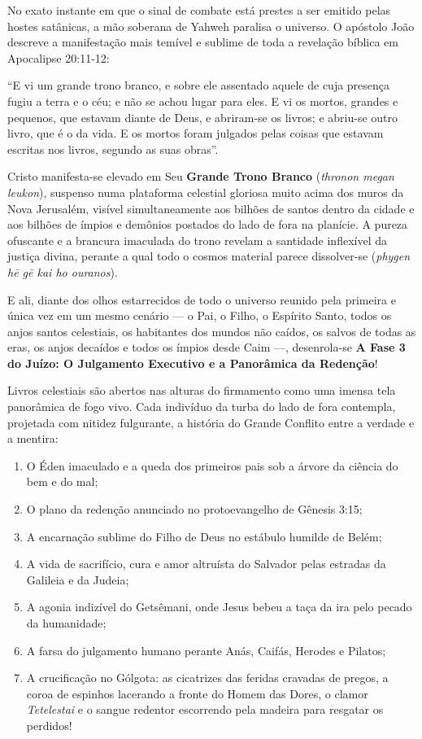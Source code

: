 \documentclass[11pt,a4paper,openany]{book}
\begin{document}
No exato instante em que o sinal de combate está prestes a ser emitido pelas hostes satânicas, a mão soberana de Yahweh paralisa o universo.
O apóstolo João descreve a manifestação mais temível e sublime de toda a revelação bíblica em Apocalipse 20:11-12:

``E vi um grande trono branco, e sobre ele assentado aquele de cuja presença fugiu a terra e o céu; e não se achou lugar para eles. E vi os mortos, grandes e pequenos, que estavam diante de Deus, e abriram-se os livros; e abriu-se outro livro, que é o da vida. E os mortos foram julgados pelas coisas que estavam escritas nos livros, segundo as suas obras''.

Cristo manifesta-se elevado em Seu \textbf{Grande Trono Branco} (\textit{thronon megan leukon}), suspenso numa plataforma celestial gloriosa muito acima dos muros da Nova Jerusalém, visível simultaneamente aos bilhões de santos dentro da cidade e aos bilhões de ímpios e demônios postados do lado de fora na planície. A pureza ofuscante e a brancura imaculada do trono revelam a santidade inflexível da justiça divina, perante a qual todo o cosmos material parece dissolver-se (\textit{phygen hē gē kai ho ouranos}).

E ali, diante dos olhos estarrecidos de todo o universo reunido pela primeira e única vez em um mesmo cenário — o Pai, o Filho, o Espírito Santo, todos os anjos santos celestiais, os habitantes dos mundos não caídos, os salvos de todas as eras, os anjos decaídos e todos os ímpios desde Caim —, desenrola-se \textbf{A Fase 3 do Juízo: O Julgamento Executivo e a Panorâmica da Redenção}!

Livros celestiais são abertos nas alturas do firmamento como uma imensa tela panorâmica de fogo vivo.
Cada indivíduo da turba do lado de fora contempla, projetada com nitidez fulgurante, a história do Grande Conflito entre a verdade e a mentira:
\begin{enumerate}
  \item O Éden imaculado e a queda dos primeiros pais sob a árvore da ciência do bem e do mal;
  \item O plano da redenção anunciado no protoevangelho de Gênesis 3:15;
  \item A encarnação sublime do Filho de Deus no estábulo humilde de Belém;
  \item A vida de sacrifício, cura e amor altruísta do Salvador pelas estradas da Galileia e da Judeia;
  \item A agonia indizível do Getsêmani, onde Jesus bebeu a taça da ira pelo pecado da humanidade;
  \item A farsa do julgamento humano perante Anás, Caifás, Herodes e Pilatos;
  \item A crucificação no Gólgota: as cicatrizes das feridas cravadas de pregos, a coroa de espinhos lacerando a fronte do Homem das Dores, o clamor \textit{Tetelestai} e o sangue redentor escorrendo pela madeira para resgatar os perdidos!
\end{enumerate}
\end{document}
